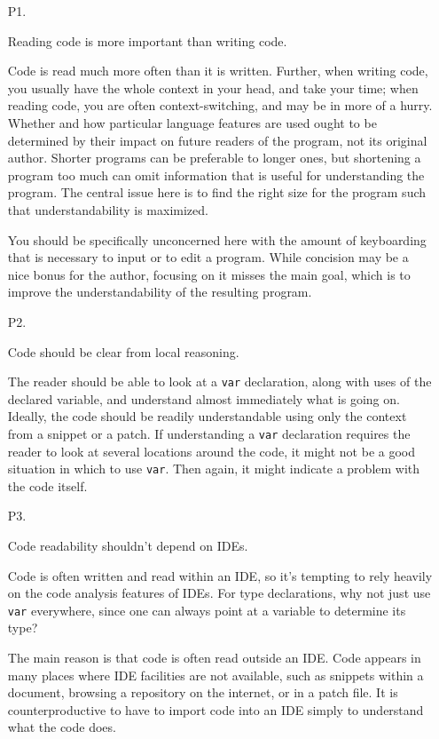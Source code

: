\documentclass[11pt,a4paper, titlepage, parskip=half, headsepline, footsepline, cleardoublepage=current, headheight=1cm]{scrbook}
\begin{document}
\begin{enumerate}
\item[P1.]{Reading code is more important than writing code.

Code is read much more often than it is written. Further, when writing code, you usually have the whole context in your head, and take your time; when reading code, you are often context-switching, and may be in more of a hurry. Whether and how particular language features are used ought to be determined by their impact on future readers of the program, not its original author. Shorter programs can be preferable to longer ones, but shortening a program too much can omit information that is useful for understanding the program. The central issue here is to find the right size for the program such that understandability is maximized.

You should be specifically unconcerned here with the amount of keyboarding that is necessary to input or to edit a program. While concision may be a nice bonus for the author, focusing on it misses the main goal, which is to improve the understandability of the resulting program.}

\item[P2.]{Code should be clear from local reasoning.

The reader should be able to look at a \lstinline|var| declaration, along with uses of the declared variable, and understand almost immediately what is going on. Ideally, the code should be readily understandable using only the context from a snippet or a patch. If understanding a \lstinline|var| declaration requires the reader to look at several locations around the code, it might not be a good situation in which to use \lstinline|var|. Then again, it might indicate a problem with the code itself.}

\item[P3.]{Code readability shouldn’t depend on IDEs.

Code is often written and read within an IDE, so it’s tempting to rely heavily on the code analysis features of IDEs. For type declarations, why not just use \lstinline|var| everywhere, since one can always point at a variable to determine its type?

The main reason is that code is often read outside an IDE. Code appears in many places where IDE facilities are not available, such as snippets within a document, browsing a repository on the internet, or in a patch file. It is counterproductive to have to import code into an IDE simply to understand what the code does.

}
\end{enumerate}
\end{document}
